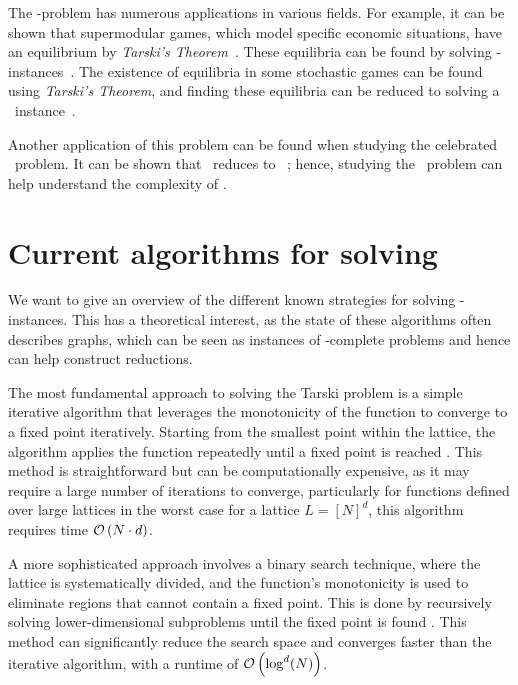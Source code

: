 The \Tarski-problem has numerous applications in various fields. For example, it can be shown that supermodular games, which model specific economic situations, have an equilibrium by \textit{Tarski's Theorem}~. These equilibria can be found by solving \Tarski-instances~\cite{etessami_tarskis_2020}. The existence of equilibria in some stochastic games can be found using \textit{Tarski's Theorem}, and finding these equilibria can be reduced to solving a \Tarski\ instance~.

Another application of this problem can be found when studying the celebrated \Arrival\ problem. It can be shown that \Arrival\ reduces to \Tarski\ ; hence, studying the \Tarski\ problem can help understand the complexity of \Arrival.

\section{Current algorithms for solving \Tarski}

We want to give an overview of the different known strategies for solving \Tarski-instances. This has a theoretical interest, as the state of these algorithms often describes graphs, which can be seen as instances of \TFNP-complete problems and hence can help construct reductions.

The most fundamental approach to solving the Tarski problem is a simple iterative algorithm that leverages the monotonicity of the function to converge to a fixed point iteratively. Starting from the smallest point within the lattice, the algorithm applies the function repeatedly until a fixed point is reached . This method is straightforward but can be computationally expensive, as it may require a large number of iterations to converge, particularly for functions defined over large lattices in the worst case for a lattice $L = [N]^d$, this algorithm requires time $\mathcal{O}\left(N \cdot d\right)$.

A more sophisticated approach involves a binary search technique, where the lattice is systematically divided, and the function's monotonicity is used to eliminate regions that cannot contain a fixed point. This is done by recursively solving lower-dimensional subproblems until the fixed point is found . This method can significantly reduce the search space and converges faster than the iterative algorithm, with a runtime of $\mathcal{O}\left(\log^d(N)\right)$.

